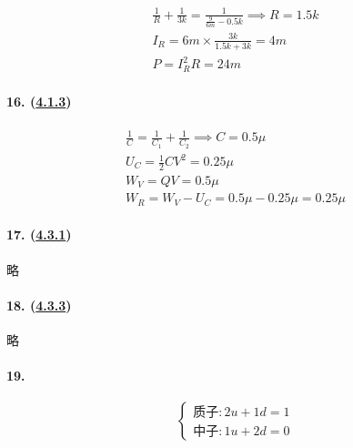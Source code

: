 \begin{gather*}
    \frac1R+\frac{1}{3k}=\frac{1}{\frac{9}{6m}-0.5k}\implies
    R=1.5k\\
    I_R=6m\times\frac{3k}{1.5k+3k}=4m\\
    P=I_R^2R=24m
\end{gather*}

\paragraph{16. (\hyperref[subsec:4.1.3]{4.1.3})}

\begin{gather*}
    \frac1C=\frac1{C_1}+\frac1{C_2}\implies C=0.5\mu\\
    U_C=\frac12CV^2=0.25\mu\\
    W_V=QV=0.5\mu\\
    W_R=W_V-U_C=0.5\mu-0.25\mu=0.25\mu
\end{gather*}

\paragraph{17. (\hyperref[subsec:4.3.1]{4.3.1})} 略
\paragraph{18. (\hyperref[subsec:4.3.3]{4.3.3})} 略
\paragraph{19.}

\begin{equation*}
    \begin{cases}
        \textrm{质子}:2u+1d=1\\
        \textrm{中子}:1u+2d=0
    \end{cases}
\end{equation*}
